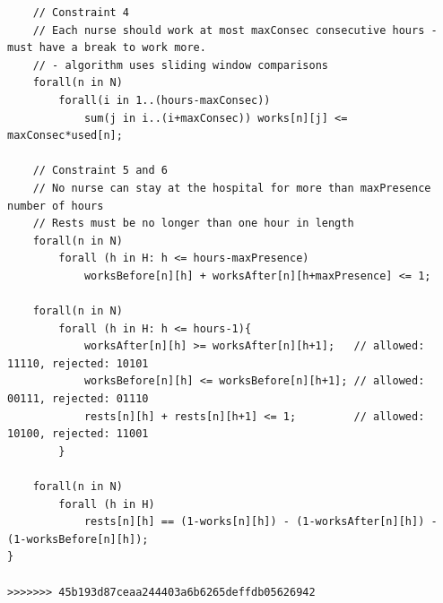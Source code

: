 \documentclass[11pt]{article}
\begin{document}
\begin{appendix}
{\begin{lstlisting}
	// Constraint 4
	// Each nurse should work at most maxConsec consecutive hours - must have a break to work more.
	// - algorithm uses sliding window comparisons
	forall(n in N)
		forall(i in 1..(hours-maxConsec))
			sum(j in i..(i+maxConsec)) works[n][j] <= maxConsec*used[n];

	// Constraint 5 and 6
	// No nurse can stay at the hospital for more than maxPresence number of hours
	// Rests must be no longer than one hour in length
	forall(n in N)
		forall (h in H: h <= hours-maxPresence)
			worksBefore[n][h] + worksAfter[n][h+maxPresence] <= 1;
	
	forall(n in N)
		forall (h in H: h <= hours-1){
			worksAfter[n][h] >= worksAfter[n][h+1];   // allowed: 11110, rejected: 10101
			worksBefore[n][h] <= worksBefore[n][h+1]; // allowed: 00111, rejected: 01110
			rests[n][h] + rests[n][h+1] <= 1;         // allowed: 10100, rejected: 11001
		}

	forall(n in N)
		forall (h in H)
			rests[n][h] == (1-works[n][h]) - (1-worksAfter[n][h]) - (1-worksBefore[n][h]); 
}

>>>>>>> 45b193d87ceaa244403a6b6265deffdb05626942
\end{lstlisting}}

\end{appendix}
\end{document}
